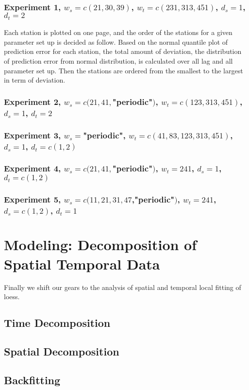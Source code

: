 \subsubsection{Experiment 1,  
\textmd{$w_s=c(21, 30, 39)$, $w_t=c(231, 313, 451)$, $d_s=1$, $d_t=2$}
}

Each station is plotted on one page, and the order of the stations for a given 
parameter set up is decided as follow. Based on the normal quantile plot of 
prediction error for each station, the total amount of deviation, the distribution 
of prediction error from normal distribution, is calculated over all lag and all 
parameter set up. Then the stations are ordered from the smallest to the largest 
in term of deviation.


\subsubsection{Experiment 2,  
\textmd{$w_s=c(21, 41, $"periodic"$)$, $w_t=c(123, 313, 451)$, $d_s=1$, $d_t=2$}
}

\subsubsection{Experiment 3,  
\textmd{$w_s=$"periodic", $w_t=c(41, 83, 123, 313, 451)$, $d_s=1$, $d_t=c(1,2)$}
}

\subsubsection{Experiment 4,  
\textmd{$w_s=c(21, 41, $"periodic"$)$, $w_t=241$, $d_s=1$, $d_t=c(1,2)$}
}

\subsubsection{Experiment 5,  
\textmd{$w_s=c(11, 21, 31, 47$,"periodic"$)$, $w_t=241$, $d_s=c(1,2)$, $d_t=1$}
}

\section{Modeling: Decomposition of Spatial Temporal Data}

Finally we shift our gears to the analysis of spatial and temporal local fitting 
of loess. 

\subsection{Time Decomposition}

\subsection{Spatial Decomposition}

\subsection{Backfitting}